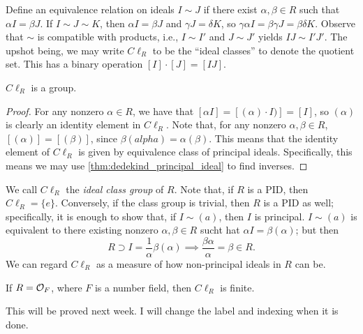 Define an equivalence relation on ideals $I \sim J$ if there exist $\alpha, \beta \in R$ such that $\alpha I = \beta J$. If $I \sim J \sim K$, then $\alpha I = \beta J$ and $\gamma J = \delta K$, so $\gamma \alpha I = \beta \gamma J = \beta \delta K$. Observe that $\sim$ is compatible with products, i.e., $I \sim I'$ and $J \sim J'$ yields $IJ \sim I' J'$. The upshot being, we may write $C\ell_R$ to be the ``ideal classes'' to denote the quotient set. This has a binary operation $[I] \cdot [J] = [IJ]$.

\begin{claim} \label{clm:ideal_classes_are_a_group}
    $C\ell_R$ is a group.
\end{claim}
\begin{proof}
    For any nonzero $\alpha \in R$, we have that $[\alpha I] = [(\alpha) \cdot I)] = [I]$, so $(\alpha)$ is clearly an identity element in $C\ell_R$. Note that, for any nonzero $\alpha, \beta \in R$, $[(\alpha)] = [(\beta)]$, since $\beta(alpha) = \alpha(\beta)$. This means that the identity element of $C\ell_R$ is given by equivalence class of principal ideals. Specifically, this means we may use \ref{thm:dedekind_principal_ideal} to find inverses.
\end{proof}

We call $C\ell_R$ the \textit{ideal class group} of $R$. Note that, if $R$ is a PID, then $C\ell_R = \{e\}$. Conversely, if the class group is trivial, then $R$ is a PID as well; specifically, it is enough to show that, if $I \sim (a)$, then $I$ is principal. $I \sim (a)$ is equivalent to there existing nonzero $\alpha, \beta \in R$ sucht hat $\alpha I = \beta(\alpha)$; but then
\[ R \supset I = \frac{1}{\alpha} \beta(\alpha) \implies \frac{\beta \alpha}{\alpha} = \beta \in R. \]
We can regard $C\ell_R$ as a measure of how non-principal ideals in $R$ can be.

\begin{theorem} \label{thm:class_group_of_ring_of_integers}
    If $R = \mathcal O_F$, where $F$ is a number field, then $C\ell_R$ is finite.
\end{theorem}
{\color{amethyst} This will be proved next week. I will change the label and indexing when it is done.}

